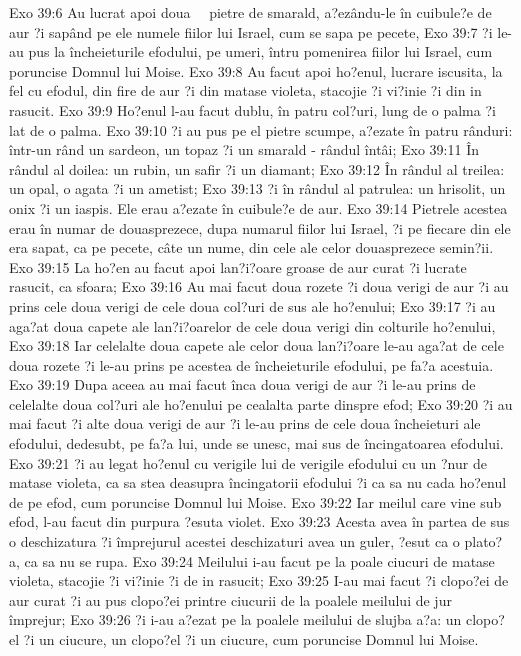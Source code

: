 Exo 39:6  Au lucrat apoi doua   pietre de smarald, a?ezându-le în cuibule?e de aur ?i sapând pe ele numele fiilor lui Israel, cum se sapa pe pecete,
Exo 39:7  ?i le-au pus la încheieturile efodului, pe umeri, întru pomenirea fiilor lui Israel, cum poruncise Domnul lui Moise.
Exo 39:8  Au facut apoi ho?enul, lucrare iscusita, la fel cu efodul, din fire de aur ?i din matase violeta, stacojie ?i vi?inie ?i din in rasucit.
Exo 39:9  Ho?enul l-au facut dublu, în patru col?uri, lung de o palma ?i lat de o palma.
Exo 39:10  ?i au pus pe el pietre scumpe, a?ezate în patru rânduri: într-un rând un sardeon, un topaz ?i un smarald - rândul întâi;
Exo 39:11  În rândul al doilea: un rubin, un safir ?i un diamant;
Exo 39:12  În rândul al treilea: un opal, o agata ?i un ametist;
Exo 39:13  ?i în rândul al patrulea: un hrisolit, un onix ?i un iaspis. Ele erau a?ezate în cuibule?e de aur.
Exo 39:14  Pietrele acestea erau în numar de douasprezece, dupa numarul fiilor lui Israel, ?i pe fiecare din ele era sapat, ca pe pecete, câte un nume, din cele ale celor douasprezece semin?ii.
Exo 39:15  La ho?en au facut apoi lan?i?oare groase de aur curat ?i lucrate rasucit, ca sfoara;
Exo 39:16  Au mai facut doua rozete ?i doua verigi de aur ?i au prins cele doua verigi de cele doua col?uri de sus ale ho?enului;
Exo 39:17  ?i au aga?at doua capete ale lan?i?oarelor de cele doua verigi din colturile ho?enului,
Exo 39:18  Iar celelalte doua capete ale celor doua lan?i?oare le-au aga?at de cele doua rozete ?i le-au prins pe acestea de încheieturile efodului, pe fa?a acestuia.
Exo 39:19  Dupa aceea au mai facut înca doua verigi de aur ?i le-au prins de celelalte doua col?uri ale ho?enului pe cealalta parte dinspre efod;
Exo 39:20  ?i au mai facut ?i alte doua verigi de aur ?i le-au prins de cele doua încheieturi ale efodului, dedesubt, pe fa?a lui, unde se unesc, mai sus de încingatoarea efodului.
Exo 39:21  ?i au legat ho?enul cu verigile lui de verigile efodului cu un ?nur de matase violeta, ca sa stea deasupra încingatorii efodului ?i ca sa nu cada ho?enul de pe efod, cum poruncise Domnul lui Moise.
Exo 39:22  Iar meilul care vine sub efod, l-au facut din purpura ?esuta violet.
Exo 39:23  Acesta avea în partea de sus o deschizatura ?i împrejurul acestei deschizaturi avea un guler, ?esut ca o plato?a, ca sa nu se rupa.
Exo 39:24  Meilului i-au facut pe la poale ciucuri de matase violeta, stacojie ?i vi?inie ?i de in rasucit;
Exo 39:25  I-au mai facut ?i clopo?ei de aur curat ?i au pus clopo?ei printre ciucurii de la poalele meilului de jur împrejur;
Exo 39:26  ?i i-au a?ezat pe la poalele meilului de slujba a?a: un clopo?el ?i un ciucure, un clopo?el ?i un ciucure, cum poruncise Domnul lui Moise.
